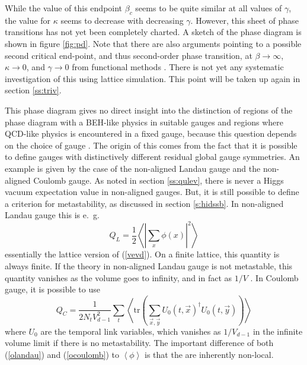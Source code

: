 \documentclass[final,12pt]{article}
\newcommand*{\no}{\noindent}
\newcommand*{\be}{\begin{equation}}
\newcommand*{\ee}{\end{equation}}
\newcommand*{\pref}[1]{(\ref{#1})}
\newcommand*{\tr}{\mathrm{tr}}
\newcommand*{\1}{1\!\!\!\bot}
\newcommand*{\la}{\left\langle}
\newcommand*{\ra}{\right\rangle}
\begin{document}
While the value of this endpoint $\beta_c$ seems to be quite similar at all values of $\gamma$, the value for $\kappa$ seems to decrease with decreasing $\gamma$. However, this sheet of phase transitions has not yet been completely charted. A sketch of the phase diagram is shown in figure \ref{fig:pd}. Note that there are also arguments pointing to a possible second critical end-point, and thus second-order phase transition, at $\beta\to\infty$, $\kappa\to 0$, and $\gamma\to 0$ from functional methods \cite{Gies:2015lia,Gies:2016kkk}. There is not yet any systematic investigation of this using lattice simulation. This point will be taken up again in section \ref{ss:triv}. 

This phase diagram gives no direct insight into the distinction of regions of the phase diagram with a BEH-like physics in suitable gauges and regions where QCD-like physics is encountered in a fixed gauge, because this question depends on the choice of gauge \cite{Caudy:2007sf}. The origin of this comes from the fact that it is possible to define gauges with distinctively different residual global gauge symmetries. An example is given by the case of the non-aligned Landau gauge and the non-aligned Coulomb gauge. As noted in section \ref{ss:qulev}, there is never a Higgs vacuum expectation value in non-aligned gauges. But, it is still possible to define a criterion for metastability, as discussed in section \ref{s:hidssb}. In non-aligned Landau gauge this is e.\ g.\ \cite{Caudy:2007sf,Langfeld:2002ic}
\be
Q_L=\frac{1}{2}\la\left|\sum_x\phi(x)\right|^2\ra\label{olandau}
\ee
\no essentially the lattice version of \pref{vevd}. On a finite lattice, this quantity is always finite. If the theory in non-aligned Landau gauge is not metastable, this quantity vanishes as the volume goes to infinity, and in fact as $1/V$ \cite{Caudy:2007sf,Maas:2012ct}. In Coulomb gauge, it is possible to use \cite{Caudy:2007sf,Greensite:2003xf}
\be
Q_C=\frac{1}{2N_tV_{d-1}^2}\sum_t\la\tr\left(\sum_{\vec x,\vec y}U_0(t,\vec x)^\dagger U_0(t,\vec y)\right)\ra\label{ocoulomb}
\ee
\no where $U_0$ are the temporal link variables, which vanishes as $1/V_{d-1}$ in the infinite volume limit if there is no metastability. The important difference of both \pref{olandau} and \pref{ocoulomb} to $\la \phi\ra$ is that the are inherently non-local.
\end{document}

